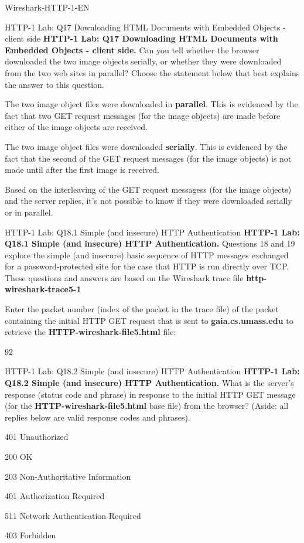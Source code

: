 \documentclass[a4paper]{article}
\begin{document}
\begin{quiz}{Wireshark-HTTP-1-EN}
\begin{multi}[points=1,shuffle]{HTTP-1 Lab: Q17 Downloading HTML Documents with Embedded Objects - client side}
\textbf{HTTP-1 Lab: Q17 Downloading HTML Documents with Embedded Objects - client side.} Can you tell whether the browser downloaded the two image objects serially, or whether they were downloaded from the two web sites in parallel? Choose the statement below that best explains the answer to this question.  
\item The two image object files were downloaded in \textbf{parallel}. This is evidenced by the fact that two GET request messages (for the image objects) are made before either of the image objects are received.
\item* The two image object files were downloaded \textbf{serially}. This is evidenced by the fact that the second of the GET request messages (for the image objects) is not made until after the first image is received. 
\item Based on the interleaving of the GET request messagess (for the image objects) and the server replies, it's not possible to know if they were downloaded serially or in parallel.
\end{multi}

\begin{shortanswer}[points=1]{HTTP-1 Lab: Q18.1 Simple (and insecure) HTTP Authentication}
\textbf{HTTP-1 Lab: Q18.1 Simple (and insecure) HTTP Authentication.}
Questions 18 and 19 explore the simple (and insecure) basic sequence of HTTP messages exchanged for a password-protected site for the case that HTTP is run directly over TCP. These questions and answers are based on the Wireshark trace file \textbf{http-wireshark-trace5-1}

Enter the packet number (index of the packet in the trace file) of the packet containing the initial HTTP GET request that is sent to \textbf{gaia.cs.umass.edu} to retrieve the \textbf{HTTP-wireshark-file5.html} file:
\item 92
\end{shortanswer}

\begin{multi}[points=1,shuffle]{HTTP-1 Lab: Q18.2 Simple (and insecure) HTTP Authentication}
\textbf{HTTP-1 Lab: Q18.2 Simple (and insecure) HTTP Authentication.}
What is the server's response (status code and phrase) in response to the initial HTTP GET message (for the \textbf{HTTP-wireshark-file5.html} base file) from the browser? (Aside: all replies below are valid response codes and phrases).   
\item* 401 Unauthorized
\item 200 OK
\item 203 Non-Authoritative Information
\item 401 Authorization Required
\item 511 Network Authentication Required
\item 403 Forbidden
\end{multi}


\end{quiz}
\end{document}
